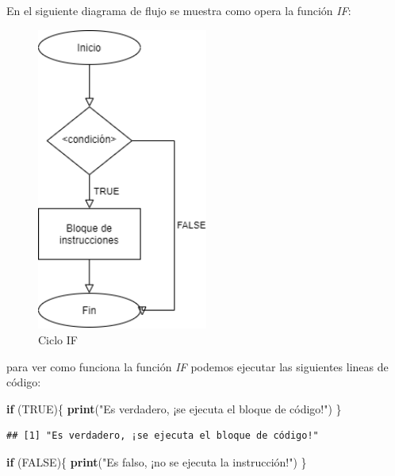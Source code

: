 \documentclass[11pt,]{article}
\newenvironment{Shaded}{\begin{snugshade}}{\end{snugshade}}
\newcommand{\ControlFlowTok}[1]{\textcolor[rgb]{0.13,0.29,0.53}{\textbf{#1}}}
\newcommand{\KeywordTok}[1]{\textcolor[rgb]{0.13,0.29,0.53}{\textbf{#1}}}
\newcommand{\NormalTok}[1]{#1}
\newcommand{\OtherTok}[1]{\textcolor[rgb]{0.56,0.35,0.01}{#1}}
\newcommand{\StringTok}[1]{\textcolor[rgb]{0.31,0.60,0.02}{#1}}
\begin{document}
En el siguiente diagrama de flujo se muestra como opera la función
\emph{IF}:

\begin{figure}
\hypertarget{id}{%
\centering
\includegraphics[width=0.5\textwidth,height=0.3\textheight]{../schemas/IF.png}
\caption{Ciclo IF}\label{id}
}
\end{figure}

para ver como funciona la función \emph{IF} podemos ejecutar las
siguientes lineas de código:

\begin{Shaded}
\begin{Highlighting}[]
\ControlFlowTok{if}\NormalTok{ (}\OtherTok{TRUE}\NormalTok{)\{}
  \KeywordTok{print}\NormalTok{(}\StringTok{"Es verdadero, ¡se ejecuta el bloque de código!"}\NormalTok{)}
\NormalTok{\}}
\end{Highlighting}
\end{Shaded}

\begin{verbatim}
## [1] "Es verdadero, ¡se ejecuta el bloque de código!"
\end{verbatim}

\begin{Shaded}
\begin{Highlighting}[]
\ControlFlowTok{if}\NormalTok{ (}\OtherTok{FALSE}\NormalTok{)\{}
  \KeywordTok{print}\NormalTok{(}\StringTok{"Es falso, ¡no se ejecuta la instrucción!"}\NormalTok{)}
\NormalTok{\}}
\end{Highlighting}
\end{Shaded}
\end{document}
